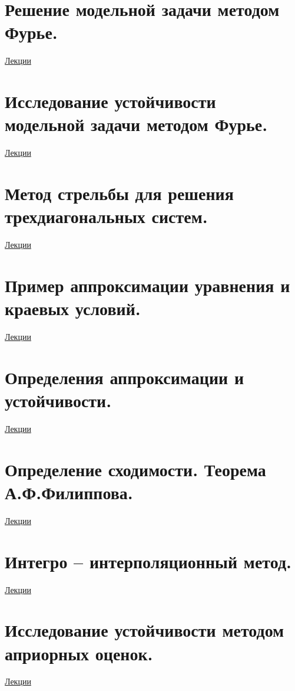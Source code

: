 \documentclass[specialist, subf, href, colorlinks=true, 12pt, times, mtpro, final]{disser}
\theoremstyle{definition}
\begin{document}
{\section {Решение модельной задачи методом Фурье.}
    \hyperlink {lects.108}{Лекции}\\

\section {Исследование устойчивости модельной задачи методом Фурье.}
    \hyperlink {lects.111}{Лекции}\\

\section {Метод стрельбы для решения трехдиагональных систем.}
    \hyperlink {lects.112}{Лекции}\\

\section {Пример аппроксимации уравнения и краевых условий.}
    \hyperlink {lects.115}{Лекции}\\

\section {Определения аппроксимации и устойчивости.}
    \hyperlink {lects.118}{Лекции}\\

\section {Определение сходимости. Теорема А.Ф.Филиппова.}
    \hyperlink {lects.120}{Лекции}\\

\section {Интегро -- интерполяционный метод.}
    \hyperlink {lects.121}{Лекции}\\

\section {Исследование устойчивости методом априорных оценок.}
    \hyperlink {lects.125}{Лекции}\\

}
\end{document}
